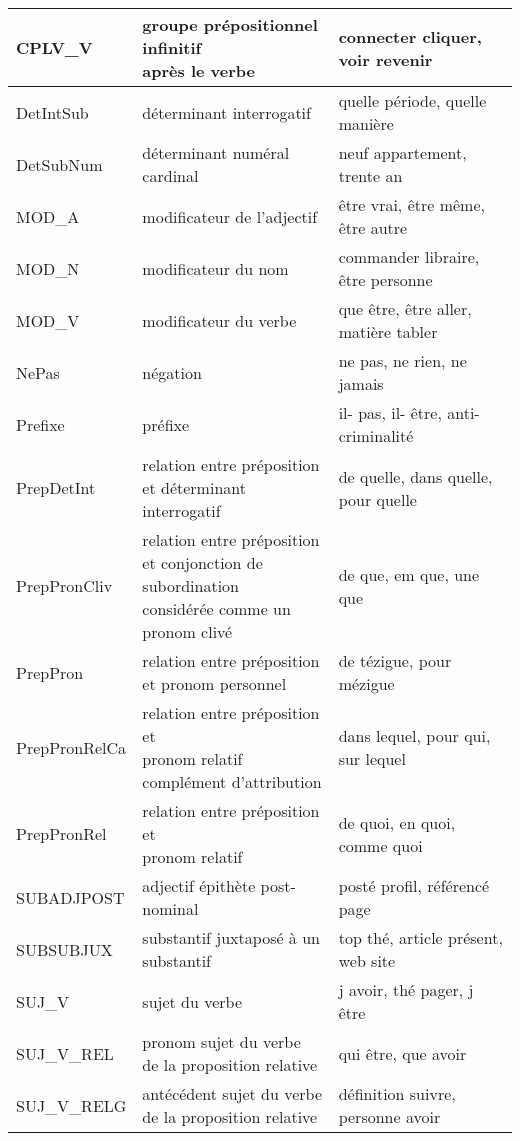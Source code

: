 \documentclass[oneside,parskip,draft]{scrbook}
\makeatletter
\newcommand{\specialcell}[2][l]{%
      \begin{tabular}[#1]{@{}l@{}}#2\end{tabular}}
\makeatother
\begin{document}
\begin{longtable}{lll}
    CPLV\_V       &  \specialcell{groupe prépositionnel infinitif \\ après le verbe} & connecter cliquer, voir revenir \\ \midrule
    DetIntSub     &  déterminant interrogatif              & quelle période, quelle manière \\ \midrule
    DetSubNum     &  déterminant numéral cardinal          & neuf appartement, trente an \\ \midrule
    MOD\_A        &  modificateur de l'adjectif            & être vrai, être même, être autre \\ \midrule
    MOD\_N        &  modificateur du nom                   & commander libraire, être personne  \\ \midrule
    MOD\_V        &  modificateur du verbe                 & que être, être aller, matière tabler \\ \midrule
    NePas         &  négation                              & ne pas, ne rien, ne jamais \\ \midrule
    Prefixe       &  préfixe                               & il- pas, il- être, anti-criminalité \\ \midrule
    PrepDetInt    &  \specialcell{relation entre préposition \\ et déterminant interrogatif} & de quelle, dans quelle, pour quelle \\ \midrule
    PrepPronCliv  &  \specialcell{relation entre préposition \\ et conjonction de subordination \\ considérée comme un pronom clivé} & de que, em que, une que \\ \midrule
    PrepPron      &  \specialcell{relation entre préposition \\ et pronom personnel} & de tézigue, pour mézigue \\ \midrule
    PrepPronRelCa &  \specialcell{relation entre préposition et \\ pronom relatif \\complément d'attribution} & dans lequel, pour qui, sur lequel  \\ \midrule
    PrepPronRel   &  \specialcell{relation entre préposition et \\ pronom relatif} & de quoi, en quoi, comme quoi \\ \midrule
    SUBADJPOST    &  adjectif épithète post-nominal        & posté profil, référencé page \\ \midrule
    SUBSUBJUX     &  substantif juxtaposé à un substantif  & top thé, article présent, web site \\ \midrule
    SUJ\_V        &  sujet du verbe                        & j avoir, thé pager, j être \\ \midrule
    SUJ\_V\_REL   &  \specialcell{pronom sujet du verbe \\ de la proposition relative} & qui être, que avoir \\ \midrule
    SUJ\_V\_RELG  &  \specialcell{antécédent sujet du verbe \\ de la proposition relative} & définition suivre, personne avoir \\
    \bottomrule


\end{longtable}
\end{document}
